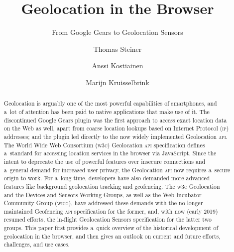 \documentclass[sigconf,hyphens]{acmart}
\begin{document}
\title{Geolocation in the Browser}  

\subtitle{From Google Gears to Geolocation Sensors}

\author{Thomas Steiner}

\author{Anssi Kostiainen}

\author{Marijn Kruisselbrink}

\begin{abstract}
Geolocation is arguably one of the most powerful capabilities of smartphones,
and a~lot of attention has been paid to native applications that make use of it.
The discontinued Google Gears plugin was the first approach to access exact location data
on the Web as well, apart from coarse location lookups
based on Internet Protocol (\textsc{ip}) addresses;
and the plugin led directly to the now widely implemented Geolocation \textsc{api}.
The World Wide Web Consortium (\textsc{w3c}) Geolocation \textsc{api} specification
defines a~standard for accessing location services in the browser via JavaScript.
Since the intent to deprecate the use of powerful features over insecure connections
and a~general demand for increased user privacy,
the Geolocation \textsc{api} now requires a~secure origin to work.
For a~long time, developers have also demanded more advanced features
like background geolocation tracking and geofencing.
The \textsc{w3c} Geolocation and the Devices and Sensors Working Groups,
as well as the Web Incubator Community Group (\textsc{wicg}), have addressed these demands
with the no longer maintained Geofencing \textsc{api} specification for the former,
and, with now (early 2019) resumed efforts, the in-flight Geolocation Sensors specification
for the latter two groups.
This paper first provides a~quick overview of the historical
development of geolocation in the browser, and then gives an outlook
on current and future efforts, challenges, and use cases.
\end{abstract}
\end{document}
